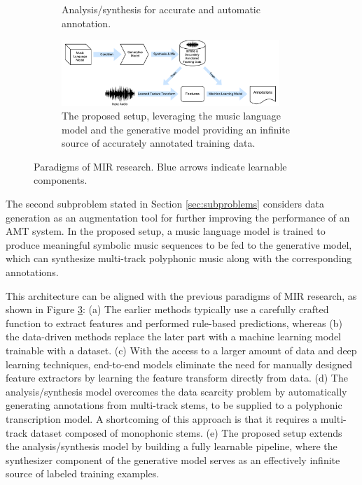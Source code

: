 \begin{figure}
\begin{subfigure}[b]{\textwidth}
		\caption{Analysis/synthesis \cite{salamon2017analysis} for accurate and automatic annotation.}
		\label{}
	\end{subfigure}
	\begin{subfigure}[b]{\textwidth}
		\centering
		\vspace{1em}
		\includegraphics[width=0.9\textwidth]{paradigms-5-proposed.pdf}
		\caption{The proposed setup, leveraging the music language model and the generative model providing an infinite source of accurately annotated training data.}
		\label{}
	\end{subfigure}
	\caption{Paradigms of MIR research. Blue arrows indicate learnable components.}
	\label{fig:paradigms}
\end{figure}


The second subproblem stated in Section \ref{sec:subproblems} considers data generation as an augmentation tool for further improving the performance of an AMT system.
In the proposed setup, a music language model is trained to produce meaningful symbolic music sequences to be fed to the generative model, which can synthesize multi-track polyphonic music along with the corresponding annotations.

This architecture can be aligned with the previous paradigms of MIR research, as shown in Figure \ref{fig:paradigms}:
(a) The earlier methods typically use a carefully crafted function to extract features and performed rule-based predictions, whereas (b) the data-driven methods replace the later part with a machine learning model trainable with a dataset.
(c) With the access to a larger amount of data and deep learning techniques, end-to-end models eliminate the need for manually designed feature extractors by learning the feature transform directly from data.
(d) The analysis/synthesis model \cite{salamon2017analysis} overcomes the data scarcity problem by automatically generating annotations from multi-track stems, to be supplied to a polyphonic transcription model.
A shortcoming of this approach is that it requires a multi-track dataset composed of monophonic stems.
(e) The proposed setup extends the analysis/synthesis model by building a fully learnable pipeline, where the synthesizer component of the generative model serves as an effectively infinite source of labeled training examples.


